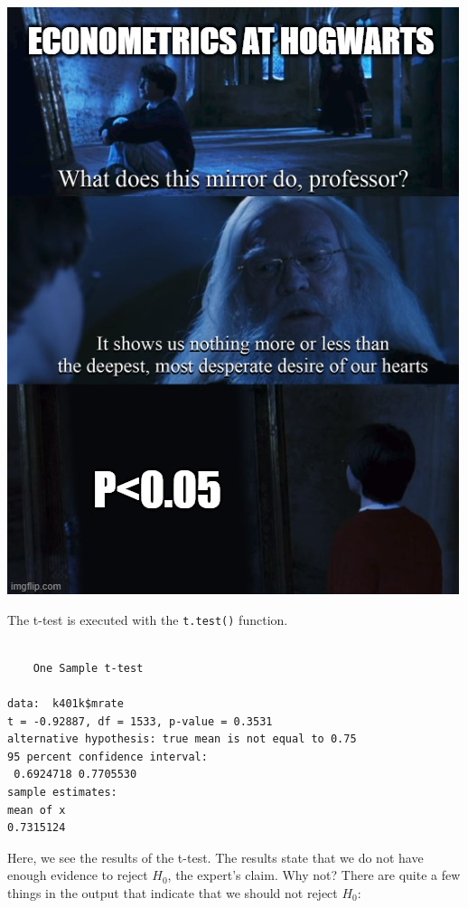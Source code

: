 \documentclass[
  letterpaper,
]{book}
\newenvironment{Shaded}{\begin{snugshade}}{\end{snugshade}}
\newcommand{\AttributeTok}[1]{\textcolor[rgb]{0.40,0.45,0.13}{#1}}
\newcommand{\DecValTok}[1]{\textcolor[rgb]{0.68,0.00,0.00}{#1}}
\newcommand{\FloatTok}[1]{\textcolor[rgb]{0.68,0.00,0.00}{#1}}
\newcommand{\FunctionTok}[1]{\textcolor[rgb]{0.28,0.35,0.67}{#1}}
\newcommand{\NormalTok}[1]{\textcolor[rgb]{0.00,0.23,0.31}{#1}}
\newcommand{\SpecialCharTok}[1]{\textcolor[rgb]{0.37,0.37,0.37}{#1}}
\newcommand{\StringTok}[1]{\textcolor[rgb]{0.13,0.47,0.30}{#1}}
\begin{document}
\begin{center}
\includegraphics[width=0.7\linewidth,height=\textheight,keepaspectratio]{images/significantharry.jpg}
\end{center}

The t-test is executed with the \texttt{t.test()} function.

\begin{Shaded}
\end{Shaded}

\begin{verbatim}

    One Sample t-test

data:  k401k$mrate
t = -0.92887, df = 1533, p-value = 0.3531
alternative hypothesis: true mean is not equal to 0.75
95 percent confidence interval:
 0.6924718 0.7705530
sample estimates:
mean of x 
0.7315124 
\end{verbatim}

Here, we see the results of the t-test. The results state that we do not
have enough evidence to reject \(H_0\), the expert's claim. Why not?
There are quite a few things in the output that indicate that we should
not reject \(H_0\):
\end{document}
